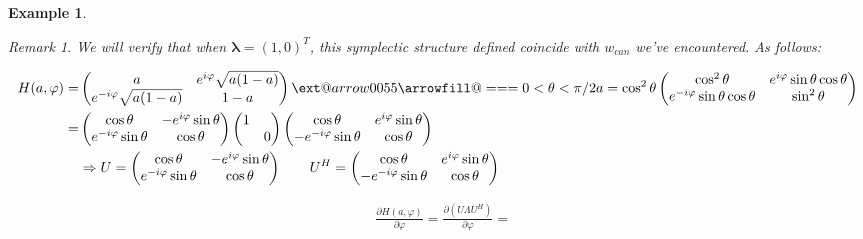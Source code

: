 \documentclass[11pt]{amsart}
\makeatletter
\numberwithin{equation}{section}
\theoremstyle{plain}
\newtheorem{eg}[theorem]{Example}
\theoremstyle{plain}
\numberwithin{equation}{section}
\theoremstyle{remark}
\newtheorem{remark}[theorem]{Remark}
\newcommand*{\Relbarfill@}{\arrowfill@\Relbar\Relbar\Relbar}
\newcommand*{\xeq}[2][]{\ext@arrow 0055\Relbarfill@{#1}{#2}}
\makeatother
\begin{document}
\begin{eg}
\begin{remark}
		We will verify that when $\bm{\lambda}=(1,0)^T$, this symplectic structure defined coincide with $w_{can}$ we've encountered. As follows:

\begin{list}{}%
	\item 
		\begin{equation*}
		\begin{aligned}
		H(a,\varphi)=&
		\begin{pmatrix}
		a & e^{i\varphi} \sqrt{a(1-a)} \\
		e^{-i\varphi} \sqrt{a(1-a)} & 1-a
		\end{pmatrix}
		\xeq[0<\theta<\pi/2]{a=\cos^2 \theta }%
		\begin{pmatrix}
		\cos^2 \theta & e^{i\varphi} \sin \theta \cos \theta \\
		e^{-i\varphi} \sin \theta \cos \theta & \sin^2 \theta
		\end{pmatrix}\\
		=&
		\begin{pmatrix}
		\cos \theta & -e^{i\varphi} \sin \theta  \\
		e^{-i\varphi} \sin \theta  & \cos \theta
		\end{pmatrix}
		\begin{pmatrix}
		1&\\
		&0
		\end{pmatrix}
		\begin{pmatrix}
		\cos \theta & e^{i\varphi} \sin \theta  \\
		-e^{-i\varphi} \sin \theta  & \cos \theta
		\end{pmatrix}\\
			&\Rightarrow U=\begin{pmatrix}
		\cos \theta & -e^{i\varphi} \sin \theta  \\
		e^{-i\varphi} \sin \theta  & \cos \theta
		\end{pmatrix} \qquad
		U^H=\begin{pmatrix}
		\cos \theta & e^{i\varphi} \sin \theta  \\
		-e^{-i\varphi} \sin \theta  & \cos \theta
		\end{pmatrix}
		\end{aligned}
		\end{equation*}
	\item 
		\begin{equation*}
		\begin{aligned}
		&\frac{\partial H(a,\varphi)}{\partial \varphi}=
		\frac{\partial (U\Lambda U^H)}{\partial \varphi}=

\end{aligned}
\end{equation*}
\end{list}
\end{remark}
\end{eg}
\end{document}
